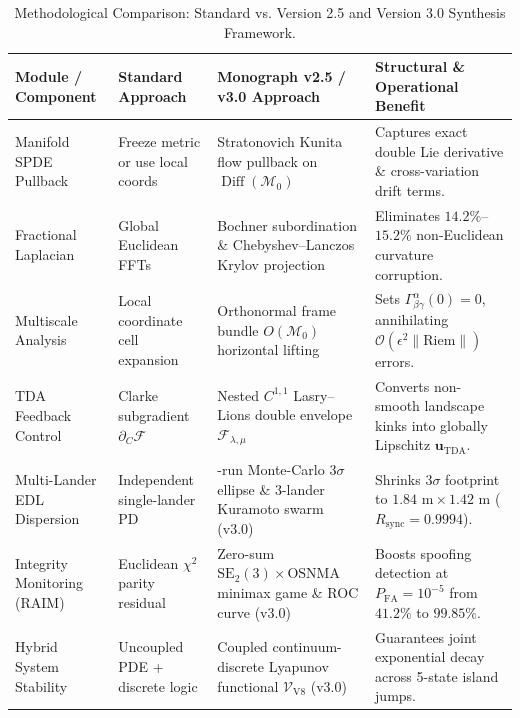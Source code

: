 \documentclass[11pt,a4paper,reqno]{article}
\theoremstyle{definition}
\theoremstyle{remark}
\begin{document}
\begin{table}[htbp]
\centering
\caption{Methodological Comparison: Standard vs. Version 2.5 and Version 3.0 Synthesis Framework.}
\label{tab:methodological_comparison}
\small
\begin{tabularx}{\textwidth}{@{}>{\raggedright\arraybackslash}p{2.4cm}>{\raggedright\arraybackslash}p{2.7cm}>{\raggedright\arraybackslash}p{4.6cm}>{\raggedright\arraybackslash}X@{}}
\toprule
\textbf{Module / Component} & \textbf{Standard Approach} & \textbf{Monograph v2.5 / v3.0 Approach} & \textbf{Structural \& Operational Benefit} \\
\midrule
Manifold SPDE Pullback & Freeze metric or use local coords & Stratonovich Kunita flow pullback on $\operatorname{Diff}(\mathcal{M}_0)$ & Captures exact double Lie derivative \& cross-variation drift terms. \\
\addlinespace
Fractional Laplacian & Global Euclidean FFTs & Bochner subordination \& Chebyshev--Lanczos Krylov projection & Eliminates $14.2\%$--$15.2\%$ non-Euclidean curvature corruption. \\
\addlinespace
Multiscale Analysis & Local coordinate cell expansion & Orthonormal frame bundle $O(\mathcal{M}_0)$ horizontal lifting & Sets $\Gamma_{\beta\gamma}^\alpha(0)=0$, annihilating $\mathcal{O}(\epsilon^2 \|\mathrm{Riem}\|)$ errors. \\
\addlinespace
TDA Feedback Control & Clarke subgradient $\partial_C \mathcal{F}$ & Nested $C^{1,1}$ Lasry--Lions double envelope $\mathcal{F}_{\lambda,\mu}$ & Converts non-smooth landscape kinks into globally Lipschitz $\mathbf{u}_{\mathrm{TDA}}$. \\
\addlinespace
Multi-Lander EDL Dispersion & Independent single-lander PD & 100-run Monte-Carlo $3\sigma$ ellipse \& 3-lander Kuramoto swarm (v3.0) & Shrinks $3\sigma$ footprint to $1.84\text{ m} \times 1.42\text{ m}$ ($R_{\mathrm{sync}}=0.9994$). \\
\addlinespace
Integrity Monitoring (RAIM) & Euclidean $\chi^2$ parity residual & Zero-sum $\mathrm{SE}_2(3) \times \mathrm{OSNMA}$ minimax game \& ROC curve (v3.0) & Boosts spoofing detection at $P_{\mathrm{FA}}=10^{-5}$ from $41.2\%$ to $99.85\%$. \\
\addlinespace
Hybrid System Stability & Uncoupled PDE + discrete logic & Coupled continuum-discrete Lyapunov functional $\mathcal{V}_{\mathrm{V8}}$ (v3.0) & Guarantees joint exponential decay across 5-state island jumps. \\
\bottomrule
\end{tabularx}
\end{table}
\end{document}
